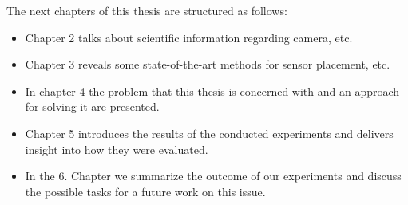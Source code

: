 The next chapters of this thesis are structured as follows: 
\begin{itemize}
    \item Chapter 2 talks about scientific information regarding camera, etc.
    \item Chapter 3 reveals some state-of-the-art methods for sensor placement, etc.
    \item In chapter 4 the problem that this thesis is concerned with and an approach for solving it are presented.
    \item Chapter 5 introduces the results of the conducted experiments and delivers insight into how they were evaluated.
    \item In the 6. Chapter we summarize the outcome of our experiments and discuss the possible tasks for a future work on this issue.
\end{itemize} 
